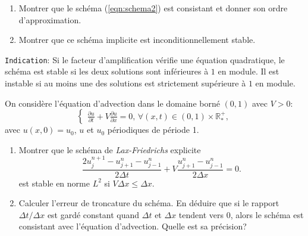 \documentclass[12pt,a4paper]{article}
\begin{document}
\begin{enumerate}
\item Montrer que le schéma (\ref{eqn:schema2}) est consistant et donner son ordre d'approximation.
\item Montrer que ce sch\'ema implicite est inconditionnellement stable. 
\end{enumerate}
\texttt{Indication}: Si le facteur d'amplification vérifie une équation quadratique, le schéma est stable si les deux solutions sont inférieures à $1$ en module. Il est instable si au moins une des solutions est strictement supérieure à $1$ en module.\\


\noindent On considère l'\'equation d'advection dans le domaine born\'e $(0,1)$ avec $V>0$:
$$
\begin{cases}
\displaystyle\frac{\partial u}{\partial t}+V\frac{\partial u}{\partial
  x}=0,\, \forall (x,t)\in(0,1)\times\mathbb{R}^+_*,
\end{cases}
$$
avec $u(x, 0) = u_0$, $u$ et $u_0$ p\'eriodiques de p\'eriode 1. \\

\begin{enumerate}
\item Montrer que le sch\'ema de {\it Lax-Friedrichs} explicite
$$
\frac{2u_j^{n+1}-u_{j+1}^{n}-u_{j-1}^{n}}{2\Delta t}+V \frac{u_{j+1}^{n}-u_{j-1}^{n}}{2\Delta x}=0.
$$
est stable en norme $L^2$ si $V\Delta x \le \Delta x$. \\

\item Calculer l'erreur de troncature du sch\'ema.
En d\'eduire que si le rapport $\Delta t/\Delta x$ est gard\'e
constant quand $\Delta t$ et $\Delta x$ tendent vers $0$, alors le
sch\'ema est consistant avec l'\'equation d'advection. Quelle est sa précision? 

%
%
\end{enumerate}
\end{document}
